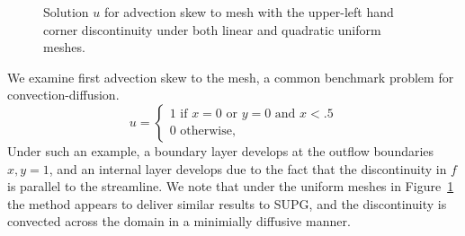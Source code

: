 \documentclass[final,leqno]{siamltex}
\begin{document}
\begin{figure}[!h]
\centering
{}
\caption{Solution $u$ for advection skew to mesh with the upper-left hand corner discontinuity under both linear and quadratic uniform meshes.}
\label{fig:skewUnif}
\end{figure}
We examine first advection skew to the mesh, a common benchmark problem for convection-diffusion.  
\[
u = \begin{cases}
1 \text{ if } x = 0 \text{ or } y = 0 \text{ and } x< .5\\
0 \text{ otherwise},
\end{cases}
\]
Under such an example, a boundary layer develops at the outflow boundaries $x,y = 1$, and an internal layer develops due to the fact that the discontinuity in $f$ is parallel to the streamline.  We note that under the uniform meshes in Figure~\ref{fig:skewUnif} the method appears to deliver similar results to SUPG, and the discontinuity is convected across the domain in a minimially diffusive manner.  
\end{document}
